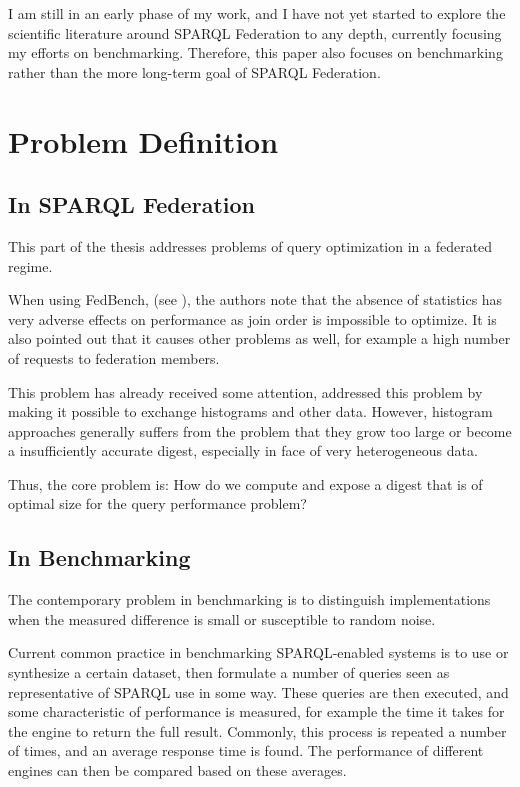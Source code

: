 \documentclass{llncs}
\begin{document}
I am still in an early phase of my work, and I have not yet started to
explore the scientific literature around SPARQL Federation to any
depth, currently focusing my efforts on benchmarking. Therefore, this
paper also focuses on benchmarking rather than the more long-term goal
of SPARQL Federation.

\section{Problem Definition}

\subsection{In SPARQL Federation}

This part of the thesis addresses problems of query optimization in a
federated regime.

When using FedBench, (see \cite{Schmidt:2011:FBS:2063016.2063054}),
the authors note that the absence of statistics has very adverse
effects on performance as join order is impossible to optimize. It is
also pointed out that it causes other problems as well, for example a
high number of requests to federation members. 

This problem has already received some attention, \cite{5337556}
addressed this problem by making it possible to exchange histograms
and other data. However, histogram approaches generally suffers from
the problem that they grow too large or become a insufficiently
accurate digest, especially in face of very heterogeneous data.

Thus, the core problem is: How do we compute and expose a digest that
is of optimal size for the query performance problem?

\subsection{In Benchmarking}

The contemporary problem in benchmarking is to distinguish
implementations when the measured difference is small or susceptible
to random noise.

Current common practice in benchmarking SPARQL-enabled systems is to
use or synthesize a certain dataset, then formulate a number of
queries seen as representative of SPARQL use in some way. These
queries are then executed, and some characteristic of performance is
measured, for example the time it takes for the engine to return the
full result. Commonly, this process is repeated a number of times, and
an average response time is found. The performance of different
engines can then be compared based on these averages.
\end{document}
